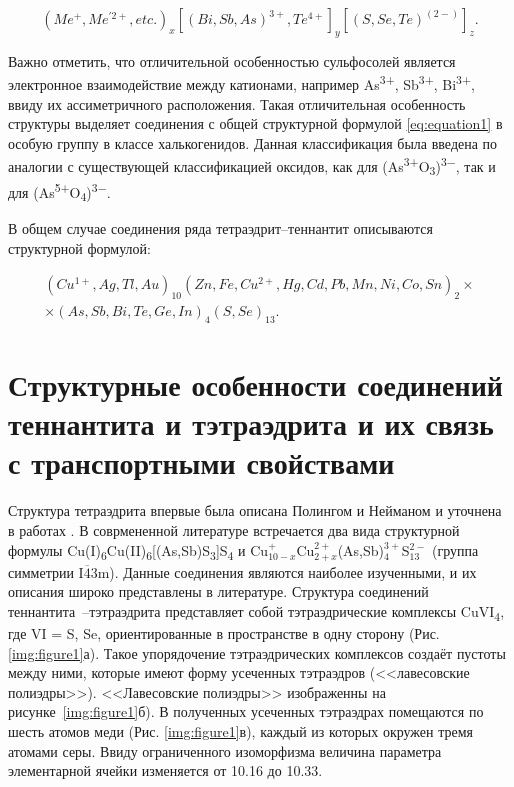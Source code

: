 \begin{equation}
  \label{eq:equation1}
  (Me^+,Me^{'2+},etc.)_{x}[(Bi, Sb,As)^{3+}, Te^{4+}]_{y}[(S,Se,Te)^{(2-)}]_{z}.
\end{equation}

Важно отметить, что отличительной особенностью сульфосолей является электронное взаимодействие между катионами, например As\textsuperscript{3+}, Sb\textsuperscript{3+}, Bi\textsuperscript{3+}, ввиду их ассиметричного расположения. Такая отличительная особенность структуры выделяет соединения с общей структурной формулой  \eqref{eq:equation1} в особую группу в классе халькогенидов. Данная классификация была введена по аналогии с существующей классификацией оксидов, как для (As\textsuperscript{3+}O\textsubscript{3})\textsuperscript{3$-$}, так и для (As\textsuperscript{5+}O\textsubscript{4})\textsuperscript{3$-$}\cite{Nowacki1969}.

В общем случае соединения ряда тетраэдрит--теннантит описываются структурной формулой: 

\begin{equation}
  \label{eq:equation2}
      \begin{multlined}
      (Cu^{1+},Ag,Tl,Au)_{10}(Zn,Fe,Cu^{2+},Hg,Cd,Pb,Mn,Ni,Co,Sn)_{2}\times \\
      \times(As,Sb,Bi,Te,Ge,In)_{4}(S,Se)_{13}. 
      \end{multlined}
\end{equation}
\newpage


\section{Структурные особенности соединений теннантита и тэтраэдрита и их связь с транспортными свойствами} \label{sect1_1}

 Структура тетраэдрита впервые была описана Полингом и Нейманом  \cite{Pauling1934} и уточнена в работах \cite{Wuensch1963,Wuensch1964,Belov1969,Kaplunnik1980}.
 В соврмененной литературе встречается два вида структурной формулы Cu(I)\textsubscript{6}Cu(II)\textsubscript{6}[(As,Sb)S\textsubscript{3}]S\textsubscript{4}\cite{Johnson1986} и Cu$_{10-x}^{+}$Cu$_{2+x}^{2+}$(As,Sb)$_{4}^{3+}$S$_{13}^{2-}$ \cite{Friese2008,makovicky2005crystal,Foit2001} (группа симметрии I$\overline{\! 4}$3m).
Данные соединения являются наиболее изученными, и их описания широко представлены в литературе. Структура соединений теннантита~--тэтраэдрита представляет собой тэтраэдрические комплексы  CuVI\textsubscript{4}, где VI = S, Se, ориентированные в пространстве в одну сторону (Рис. \ref{img:figure1}а). Такое упорядочение тэтраэдрических комплексов создаёт пустоты между ними, которые имеют форму усеченных тэтраэдров (<<лавесовские полиэдры>>). <<Лавесовские полиэдры>> изображенны на рисунке~\ref{img:figure1}б). В полученных усеченных тэтраэдрах помещаются по шесть атомов меди (Рис. \ref{img:figure1}в), каждый из которых окружен тремя атомами серы\cite{Makovicky_2006}. Ввиду ограниченного изоморфизма величина параметра элементарной ячейки изменяется от 10.16 до 10.33.

